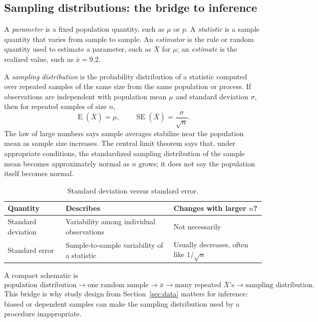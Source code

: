 \documentclass[11pt]{article}
\newcommand{\E}{\operatorname{E}}
\newcommand{\SE}{\operatorname{SE}}
\begin{document}
\subsection{Sampling distributions: the bridge to inference}
A \emph{parameter} is a fixed population quantity, such as $\mu$ or $p$.  A
\emph{statistic} is a sample quantity that varies from sample to sample.  An
\emph{estimator} is the rule or random quantity used to estimate a parameter,
such as $\bar X$ for $\mu$; an \emph{estimate} is the realized value, such as
$\bar x=9.2$.

A \emph{sampling distribution} is the probability distribution of a statistic
computed over repeated samples of the same size from the same population or
process.  If observations are independent with population mean $\mu$ and
standard deviation $\sigma$, then for repeated samples of size $n$,
\begin{equation}\label{eq:xbar-sampling}
\E(\bar X)=\mu,
\qquad
\SE(\bar X)=\frac{\sigma}{\sqrt n}.
\end{equation}
The law of large numbers says sample averages stabilize near the population
mean as sample size increases.  The central limit theorem says that, under
appropriate conditions, the standardized sampling distribution of the sample
mean becomes approximately normal as $n$ grows; it does not say the population
itself becomes normal.

\begin{table}[ht]
\centering
\caption{Standard deviation versus standard error.}\label{tab:sd-se}
\begin{tabularx}{\textwidth}{@{}lYY@{}}
\toprule
Quantity & Describes & Changes with larger $n$? \\
\midrule
Standard deviation & Variability among individual observations & Not necessarily \\
Standard error & Sample-to-sample variability of a statistic & Usually decreases, often like $1/\sqrt n$ \\
\bottomrule
\end{tabularx}
\end{table}

A compact schematic is
\[
\text{population distribution}\longrightarrow
\text{one random sample}\longrightarrow
\bar x\longrightarrow
\text{many repeated }\bar X\text{'s}\longrightarrow
\text{sampling distribution}.
\]
This bridge is why study design from Section~\ref{sec:data} matters for
inference: biased or dependent samples can make the sampling distribution
used by a procedure inappropriate.
\end{document}
